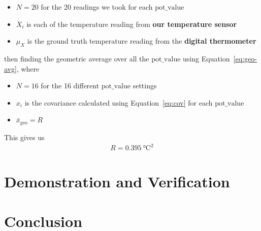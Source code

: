 \documentclass[12pt,a4paper]{article}
\begin{document}
\begin{itemize}
    \item $N=20$ for the 20 readings we took for each $\text{pot\_value}$
    \item $X_i$ is each of the temperature reading from \textbf{our temperature sensor}
    \item $\mu_X$ is the ground truth temperature reading from the \textbf{digital thermometer}
\end{itemize}
then finding the geometric average over all the $\text{pot\_value}$ using Equation~\eqref{eq:geo-avg}, where
\begin{itemize}
    \item $N=16$ for the 16 different $\text{pot\_value}$ settings
    \item $x_i$ is the covariance calculated using Equation~\eqref{eq:cov} for each $\text{pot\_value}$
    \item $\bar{x}_{\mathrm{geo}}=R$
\end{itemize}
This gives us
\begin{align*}
    R = \SI{0.395}{\degreeCelsius^2}
\end{align*}

\section{Demonstration and Verification}

\section{Conclusion}


\newpage


\end{document}
